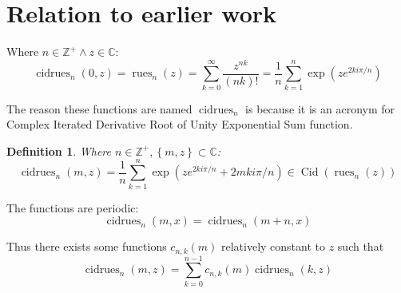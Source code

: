 \documentclass[]{article}
\DeclareMathOperator{\rues}{rues}
\DeclareMathOperator{\Cid}{Cid}
\DeclareMathOperator{\cidrues}{cidrues}
\newcommand{\pqty}[1]{{\left(#1\right)}}
\newcommand{\Bqty}[1]{{\left\{#1\right\}}}
\newtheorem{definition}[theorem]{Definition}
\numberwithin{equation}{section}
\begin{document}
	\section{Relation to earlier work}
	Where \(n\in\mathbb{Z}^+\land z\in\mathbb{C}\):
	\begin{equation}
		\cidrues_n\pqty{0,z}=
		\rues_n\pqty{z}=
		\sum_{k=0}^{\infty}\frac{z^{nk}}{\pqty{nk}!}=
		\frac{1}{n}\sum _{k=1}^n \exp\pqty{ze^{2ki\pi/n}}
	\end{equation}
	
	The reason these functions are named $\cidrues_n$ is because it is an acronym for Complex Iterated Derivative Root of Unity Exponential Sum function.
	\begin{definition}
		Where $n\in\mathbb{Z}^+,\Bqty{m,z}\subset\mathbb{C}$:
		\begin{equation}
			\label{cidrues Exponential sum form}
			\cidrues_n\pqty{m,z}=
			\frac{1}{n}\sum _{k=1}^n \exp\pqty{ze^{2ki\pi/n}+2mki\pi/n}
			\in\Cid\pqty{\rues_n\pqty{z}}
		\end{equation}
	\end{definition}
	The functions are periodic:
	\begin{equation}
		\cidrues_n\pqty{m,x}=\cidrues_n\pqty{m+n,x}
	\end{equation}

	Thus there exists some functions $c_{n,k}\pqty{m}$ relatively constant to $z$ such that
	\begin{equation}
		\cidrues_n\pqty{m,z}=\sum_{k=0}^{n-1}c_{n,k}\pqty{m}\cidrues_n\pqty{k,z}
	\end{equation}
	
\end{document}
